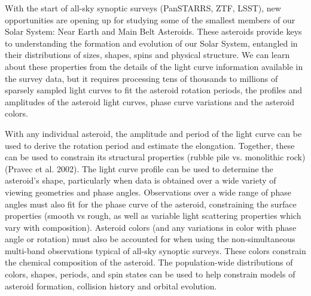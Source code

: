\documentclass[11pt]{article}
\begin{document}
%
%
%

\sciencejustification
With the start of all-sky synoptic surveys (PanSTARRS, ZTF, LSST), new opportunities
are opening up for studying some of the smallest members of our Solar System: 
Near Earth and Main Belt Asteroids. These asteroids provide keys to understanding
the formation and evolution of our Solar System, entangled in their distributions of
sizes, shapes, spins and physical structure. We can learn about these properties from
the details of the light curve information available in the survey data, but it requires processing
tens of thousands to millions of sparsely sampled light curves to fit the asteroid rotation periods, 
the profiles and amplitudes of the asteroid light curves, phase curve variations and the asteroid colors.

With any individual asteroid, the amplitude and period of the light curve can be used
to derive the rotation period and estimate the elongation. Together, these can be used
to constrain its structural properties (rubble pile vs. monolithic rock) (Pravec et al. 2002).
The light curve profile can be used to determine the 
asteroid's shape, particularly when data is obtained over a wide variety of viewing geometries
and phase angles. Observations over a wide range of phase angles must also fit for the phase curve
of the asteroid, constraining the surface properties (smooth vs rough, as well as variable light scattering properties
which vary with composition). Asteroid colors (and any variations in color with 
phase angle or rotation) must also be accounted for when using the non-simultaneous multi-band 
observations typical of all-sky synoptic surveys. These colors constrain the chemical composition of the 
asteroid. The population-wide distributions of colors, shapes, periods, and spin states can
be used to help constrain models of asteroid formation, collision history and orbital evolution.
\end{document}
